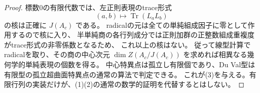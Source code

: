 \begin{proof}
標数0の有限代数では、左正則表現のtrace形式
\[
 (a,b)\longmapsto\operatorname{Tr}(L_aL_b)
\]
の核は正確に $J(A_c)$ である。
radicalの元は全ての単純組成因子に零として作用するので核に入り、
半単純商の各行列成分では正則加群の正整数組成重複度がtrace形式の非零係数となるため、
これ以上の核はない。
従って線型計算でradicalを取り、その商の中心次元
$\dim Z(A_c/J(A_c))$ を求めれば相異なる幾何学的単純表現の個数を得る。
中心特異点は孤立し有限個であり、Du Val型は有限型の孤立超曲面特異点の通常の算法で判定できる。
これが(3)を与える。有限行列の実装だけが、(1)(2)の通常の数学的証明を代替するとはしない。
\end{proof}
